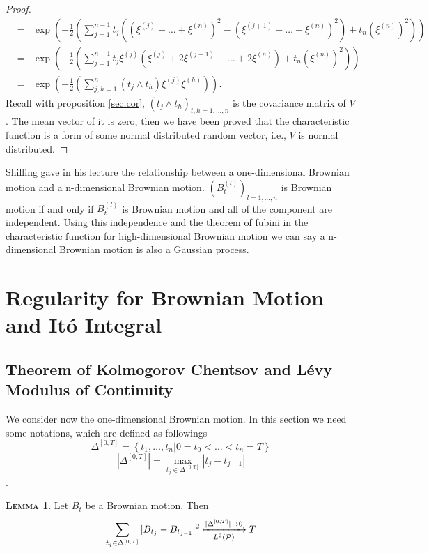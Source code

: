 \documentclass[a4paper, twoside, 11pt]{article}
\theoremstyle{definition}
\newtheorem{lemma}[definition]{\scshape Lemma}
\begin{document}
\begin{proof}
\begin{eqnarray*}
	&=& \exp\left(-\frac{1}{2}\left(\sum_{j=1}^{n-1} t_j((\xi^{(j)}+\dots+\xi^{(n)})^2 - (\xi^{(j+1)}+\dots+\xi^{(n)})^2) + t_n(\xi^{(n)})^2\right)\right)\\
	&=& \exp\left(-\frac{1}{2}\left(\sum_{j=1}^{n-1} t_j\xi^{(j)}(\xi^{(j)}+2\xi^{(j+1)}+\dots+2\xi^{(n)}) + t_n(\xi^{(n)})^2\right)\right)\\
	&=& \exp\left(-\frac{1}{2}\left(\sum_{j,h=1}^n(t_j\wedge t_h)\xi^{(j)}\xi^{(h)}\right)\right).
  \end{eqnarray*}
  Recall with proposition \ref{sec:cor}, $(t_j\wedge t_h)_{t,h=1,\dots,n}$ is the covariance matrix of $V$. The mean vector of it is zero, then we have been proved that the characteristic function is a form of some normal distributed random vector, i.e., $V$ is normal distributed.
\end{proof}

Shilling gave in his lecture \cite{shilling} the relationship between a one-dimensional Brownian motion and a n-dimensional Brownian motion.
$(B_t^{(l)})_{l=1,\dots,n}$ is Brownian motion if and only if $B_t^{(l)}$ is Brownian motion and all of the component are independent. Using this independence and the theorem of fubini in the characteristic function for high-dimensional Brownian motion we can say a n-dimensional Brownian motion is also a Gaussian process.

\newpage

\section{Regularity for Brownian Motion and It\'o Integral}
\subsection{Theorem of Kolmogorov Chentsov and L\'evy Modulus of Continuity}
We consider now the one-dimensional Brownian motion. In this section we need some notations, which are defined as followings
\begin{equation*}
\Delta^{[0,T]} = \left\{t_1,\dots,t_n|0=t_0<\dots<t_n=T\right\} 
\end{equation*}
$$
|\Delta^{[0,T]}| = \max_{t_j \in \Delta^{[0,T]}}|t_j - t_{j-1}|
$$.

\begin{lemma}
  Let $B_t$ be a Brownian motion. Then
  $$
  \sum_{t_j \in \Delta^{[0,T]}} |B_{t_j} - B_{t_{j-1}}|^2 \xmapsto[L^2(\mathcal{P})]{|\Delta^{[0,T]}|\rightarrow 0} T  
  $$
\end{lemma}
\end{document}
